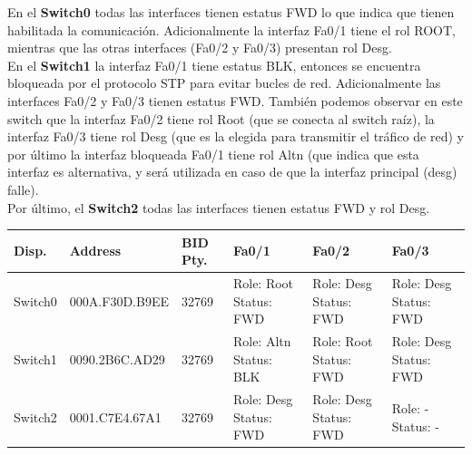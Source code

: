 \documentclass{article}
\begin{document}
    En el {\bfseries Switch0} todas las interfaces tienen estatus FWD lo que indica que tienen habilitada la comunicación. Adicionalmente la interfaz Fa0/1 tiene el rol ROOT, mientras que las otras interfaces (Fa0/2 y Fa0/3) presentan rol Desg.\\
    En el {\bfseries Switch1} la interfaz Fa0/1 tiene estatus BLK, entonces se encuentra bloqueada por el protocolo STP para evitar bucles de red. Adicionalmente las interfaces Fa0/2 y Fa0/3 tienen estatus FWD. También podemos observar en este switch que la interfaz Fa0/2 tiene rol Root (que se conecta al switch raíz), la interfaz Fa0/3 tiene rol Desg (que es la elegida para transmitir el tráfico de red) y por último la interfaz bloqueada Fa0/1 tiene rol Altn (que indica que esta interfaz es alternativa, y será utilizada en caso de que la interfaz principal (desg) falle).\\
    Por último, el {\bfseries Switch2} todas las interfaces tienen estatus FWD y rol Desg.

    \begin{center}
        \begin{tabular}{| p{2cm} | p{3.1cm} | p{2.1cm} | p{2.5cm} | p{2.5cm} | p{2.5cm} |}\hline
            {\bfseries Disp.} & {\bfseries Address} & {\bfseries BID Pty.} & {\bfseries Fa0/1} & {\bfseries Fa0/2} & {\bfseries Fa0/3} \\\hline
            Switch0 & 000A.F30D.B9EE & 32769 & 
            Role: Root \linebreak
            Status: FWD & 
            Role: Desg \linebreak
            Status: FWD & 
            Role: Desg \linebreak
            Status: FWD \\\hline
            Switch1 & 0090.2B6C.AD29 & 32769 & 
            Role: Altn \linebreak
            Status: BLK & 
            Role: Root \linebreak
            Status: FWD & 
            Role: Desg \linebreak
            Status: FWD \\\hline
            Switch2 & 0001.C7E4.67A1 & 32769 & 
            Role: Desg \linebreak
            Status: FWD & 
            Role: Desg \linebreak
            Status: FWD & 
            Role: - \linebreak
            Status: - \\\hline
        \end{tabular}
    \end{center}
\end{document}
